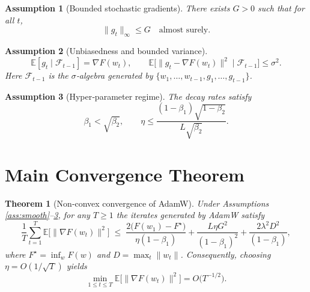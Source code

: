 \documentclass[11pt]{article}
\newtheorem{theorem}{Theorem}
\newtheorem{assumption}{Assumption}
\newcommand{\E}{\mathbb{E}}
\begin{document}
\begin{assumption}[Bounded stochastic gradients]\label{ass:bound}
There exists $G>0$ such that for all $t$,
\[
\|g_t\|_{\infty}\le G \quad\text{almost surely}.
\tag{A2}
\]
\end{assumption}

\begin{assumption}[Unbiasedness and bounded variance]\label{ass:unbiased}
\[
\E[g_t\mid \mathcal{F}_{t-1}]=\nabla F(w_t),\qquad
\E\bigl[\|g_t-\nabla F(w_t)\|^{2}\mid\mathcal{F}_{t-1}\bigr]\le\sigma^{2}.
\tag{A3}
\]
Here $\mathcal{F}_{t-1}$ is the $\sigma$‑algebra generated by
$\{w_1,\dots,w_{t-1},g_1,\dots,g_{t-1}\}$.
\end{assumption}

\begin{assumption}[Hyper‑parameter regime]\label{ass:hyper}
The decay rates satisfy
\[
\beta_{1}<\sqrt{\beta_{2}},\qquad
\eta\le\frac{(1-\beta_{1})\sqrt{1-\beta_{2}}}{L\sqrt{\beta_{2}}}.
\tag{A4}
\]
\end{assumption}

\section*{Main Convergence Theorem}
\begin{theorem}[Non‑convex convergence of AdamW]\label{thm:main}
Under Assumptions \ref{ass:smooth}–\ref{ass:hyper}, for any $T\ge1$ the iterates
generated by AdamW satisfy
\[
\frac{1}{T}\sum_{t=1}^{T}\E\!\bigl[\|\nabla F(w_t)\|^{2}\bigr]
\;\le\;
\frac{2\bigl(F(w_{1})-F^{\star}\bigr)}{\eta(1-\beta_{1})}
      +\frac{L\eta G^{2}}{(1-\beta_{1})^{2}}
      +\frac{2\lambda^{2}D^{2}}{(1-\beta_{1})},
\tag{T1}
\]
where $F^{\star}=\inf_{w}F(w)$ and $D=\max_{t}\|w_t\|$.
Consequently, choosing $\eta=O(1/\sqrt{T})$ yields
\[
\min_{1\le t\le T}\E\!\bigl[\|\nabla F(w_t)\|^{2}\bigr]=O\!\bigl(T^{-1/2}\bigr).
\]
\end{theorem}

\end{document}

